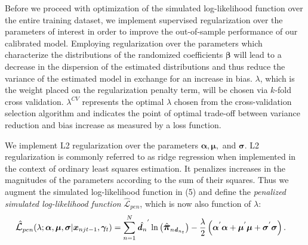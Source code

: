 \documentclass[12pt]{article}
\begin{document}
Before we proceed with optimization of the simulated log-likelihood function over the entire training dataset, we implement supervised regularization over the parameters of interest in order to improve the out-of-sample performance of our calibrated model. Employing regularization over the parameters which characterize the distributions of the randomized coefficients $\boldsymbol{\beta}$ will lead to a decrease in the dispersion of the estimated distributions and thus reduce the variance of the estimated model in exchange for an increase in bias. $\lambda$, which is the weight placed on the regularization penalty term, will be chosen via $k$-fold cross validation. $\lambda^{CV}$ represents the optimal $\lambda$ chosen from the cross-validation selection algorithm and indicates the point of optimal trade-off between variance reduction and bias increase as measured by a loss function.

We implement L2 regularization over the parameters $\boldsymbol{\alpha}, \boldsymbol{\mu},$ and $\boldsymbol{\sigma}$. L2 regularization is commonly referred to as ridge regression when implemented in the context of ordinary least squares estimation. It penalizes increases in the magnitudes of the parameters according to the sum of their squares. Thus we augment the simulated log-likelihood function in (5) and define the \textit{penalized simulated log-likelihood function} $\hat{\mathcal{L}}_{pen}$, which is now also function of $\lambda$:
\begin{align}
\mathlarger{\hat{\mathcal{L}}}_{pen}(\lambda; \boldsymbol{\alpha}, \boldsymbol{\mu}, \boldsymbol{\sigma}|\boldsymbol{x}_{njt-1}, \boldsymbol{\gamma}_t) &= \sum\limits_{n=1}^{N} \hat{\boldsymbol{\mathit{d}}_n}^{'} \ln\left(\mathlarger{\hat{\boldsymbol{\pi}}}_{n\boldsymbol{\mathit{d}}_{n_{t}}}\right) - \frac{\lambda}{2}\left(\boldsymbol{\alpha}^{'}\boldsymbol{\alpha} + \boldsymbol{\mu}^{'}\boldsymbol{\mu} + \boldsymbol{\sigma}^{'}\boldsymbol{\sigma}\right).
\end{align}
\end{document}
